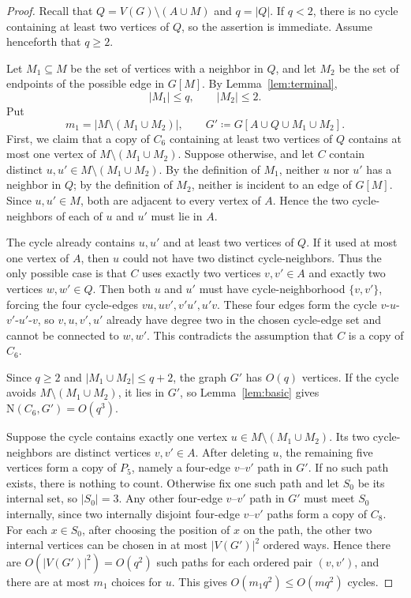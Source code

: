 \documentclass[11pt,letterpaper]{article}
\begin{document}
\begin{proof}
Recall that \(Q=V(G)\setminus(A\cup M)\) and \(q=|Q|\). If \(q<2\), there is no cycle containing at
least two vertices of \(Q\), so the assertion is immediate. Assume henceforth that \(q\ge2\).

Let \(M_1\subseteq M\) be the set of vertices with a neighbor in \(Q\), and let \(M_2\) be the set of
endpoints of the possible edge in \(G[M]\). By Lemma~\ref{lem:terminal},
\[
  |M_1|\le q,
  \qquad
  |M_2|\le2.
\]
Put
\[
  m_1=|M\setminus(M_1\cup M_2)|,
  \qquad
  G'\coloneqq G[A\cup Q\cup M_1\cup M_2].
\]
First, we claim that a copy of \(C_6\) containing at least two vertices of \(Q\) contains at most one
vertex of \(M\setminus(M_1\cup M_2)\). Suppose otherwise, and let \(C\) contain distinct
\(u,u'\in M\setminus(M_1\cup M_2)\). By the definition of \(M_1\), neither \(u\) nor \(u'\) has a
neighbor in \(Q\); by the definition of \(M_2\), neither is incident to an edge of \(G[M]\). Since
\(u,u'\in M\), both are adjacent to every vertex of \(A\). Hence the two cycle-neighbors of each of
\(u\) and \(u'\) must lie in \(A\).

The cycle already contains \(u,u'\) and at least two vertices of \(Q\). If it used at most one vertex
of \(A\), then \(u\) could not have two distinct cycle-neighbors. Thus the only possible case is that
\(C\) uses exactly two vertices \(v,v'\in A\) and exactly two vertices \(w,w'\in Q\). Then both
\(u\) and \(u'\) must have cycle-neighborhood \(\{v,v'\}\), forcing the four cycle-edges
\(v u,uv',v'u',u'v\). These four edges form the cycle \(v\)-\(u\)-\(v'\)-\(u'\)-\(v\), so
\(v,u,v',u'\) already have degree two in the chosen cycle-edge set and cannot be connected to
\(w,w'\). This contradicts the assumption that \(C\) is a copy of \(C_6\).

Since \(q\ge2\) and \(|M_1\cup M_2|\le q+2\), the graph \(G'\) has \(O(q)\) vertices. If the cycle avoids
\(M\setminus(M_1\cup M_2)\), it lies in \(G'\), so Lemma~\ref{lem:basic} gives \(\mathrm{N}(C_6,G')=O(q^3)\).

Suppose the cycle contains exactly one vertex \(u\in M\setminus(M_1\cup M_2)\). Its two cycle-neighbors
are distinct vertices \(v,v'\in A\). After deleting \(u\), the remaining five vertices form a copy of
\(P_5\), namely a four-edge \(v\)--\(v'\) path in \(G'\). If no such path exists, there is nothing to
count. Otherwise fix one such path and let \(S_0\) be its internal set, so \(|S_0|=3\). Any other
four-edge \(v\)--\(v'\) path in \(G'\) must meet \(S_0\) internally, since two internally disjoint
four-edge \(v\)--\(v'\) paths form a copy of \(C_8\). For each \(x\in S_0\), after choosing the position of
\(x\) on the path, the other two internal vertices can be chosen in at most \(|V(G')|^2\) ordered ways.
Hence there are \(O(|V(G')|^2)=O(q^2)\) such paths for each ordered pair \((v,v')\), and there are at
most \(m_1\) choices for \(u\). This gives \(O(m_1q^2)\le O(mq^2)\) cycles.
\end{proof}
\end{document}
